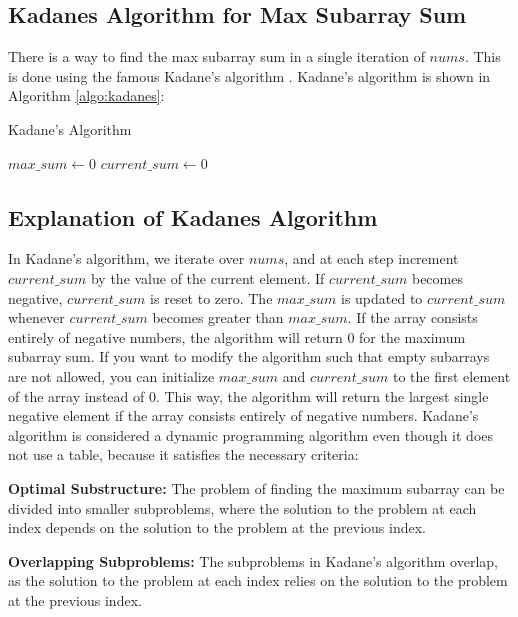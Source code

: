     
\subsection{Kadanes Algorithm for Max Subarray Sum}
    
There is a way to find the max subarray sum in a single iteration of $nums$.
This is done using the famous Kadane's algorithm \cite{kadane2023two}.
Kadane's algorithm is shown in Algorithm \ref{algo:kadanes}: 

\begin{algorithm}[H]
    \caption{Kadane's Algorithm}
    \label{algo:kadanes}
    $max\_sum \leftarrow 0$\;
    $current\_sum \leftarrow 0$\;
\end{algorithm}
\subsection*{Explanation of Kadanes Algorithm}
In Kadane's algorithm, we iterate over $nums$, and at each step increment $current\_sum$ by the value of the current element. 
If $current\_sum$ becomes negative, $current\_sum$ is reset to zero. 
The $max\_sum$ is updated to $current\_sum$ whenever $current\_sum$ becomes greater than $max\_sum$.
If the array consists entirely of negative numbers, the algorithm will return 0 for the maximum subarray sum.
If you want to modify the algorithm such that empty subarrays are not allowed, you can initialize $max\_sum$ and $current\_sum$ to the first element of the array instead of 0.
This way, the algorithm will return the largest single negative element if the array consists entirely of negative numbers.
Kadane's algorithm is considered a dynamic programming algorithm even though it does not use a table, because it satisfies the necessary criteria:

\textbf{Optimal Substructure:} The problem of finding the maximum subarray can be divided into smaller subproblems, where the solution to the problem at each index depends on the solution to the problem at the previous index.

\textbf{Overlapping Subproblems:} The subproblems in Kadane's algorithm overlap, as the solution to the problem at each index relies on the solution to the problem at the previous index.

